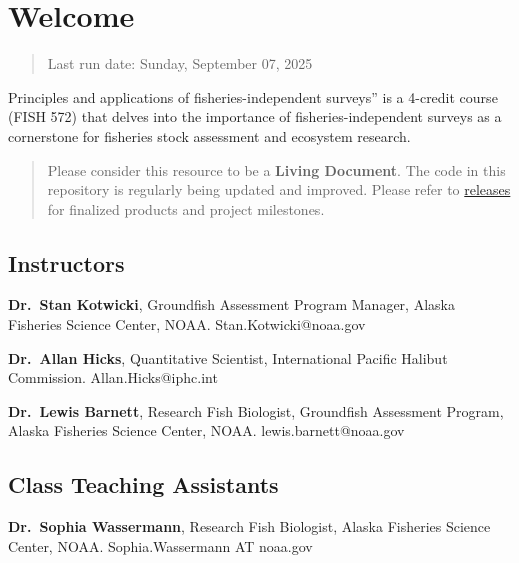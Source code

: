 \documentclass[
  letterpaper,
  oneside,
  open=any]{scrbook}
\renewcommand*\contentsname{Table of contents}
\newcommand\contentsname{Table of contents}
\begin{document}

\renewcommand*\contentsname{Table of contents}
{
\setcounter{tocdepth}{1}
\tableofcontents
}
\listoffigures
\listoftables

\mainmatter
{}

\chapter{Welcome}\label{welcome}

\begin{quote}
Last run date: Sunday, September 07, 2025
\end{quote}

Principles and applications of fisheries-independent surveys'' is a
4-credit course (FISH 572) that delves into the importance of
fisheries-independent surveys as a cornerstone for fisheries stock
assessment and ecosystem research.

\begin{quote}
Please consider this resource to be a \textbf{Living Document}. The code
in this repository is regularly being updated and improved. Please refer
to
\href{https://github.com/afsc-gap-products/UW-FISH572/releases}{releases}
for finalized products and project milestones.
\end{quote}

\section{Instructors}\label{instructors}

\textbf{Dr.~Stan Kotwicki}, Groundfish Assessment Program Manager,
Alaska Fisheries Science Center, NOAA. Stan.Kotwicki@noaa.gov

\textbf{Dr.~Allan Hicks}, Quantitative Scientist, International Pacific
Halibut Commission. Allan.Hicks@iphc.int

\textbf{Dr.~Lewis Barnett}, Research Fish Biologist, Groundfish
Assessment Program, Alaska Fisheries Science Center, NOAA.
lewis.barnett@noaa.gov

\section{Class Teaching Assistants}\label{class-teaching-assistants}

\textbf{Dr.~Sophia Wassermann}, Research Fish Biologist, Alaska
Fisheries Science Center, NOAA. Sophia.Wassermann AT noaa.gov
\end{document}
